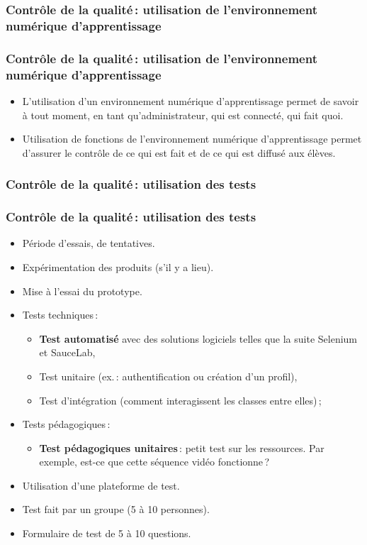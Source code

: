 					\subsubsection{Contrôle de la qualité\,: utilisation de l'environnement numérique d'apprentissage} 
							\begin{frame}
							\frametitle{Contrôle de la qualité\,: utilisation de l'environnement numérique d'apprentissage}
                        			
							\begin{itemize}
							\item L’utilisation d'un environnement numérique d'apprentissage permet de savoir à tout moment, en tant qu’administrateur, qui est connecté, qui fait quoi.
							\item Utilisation de fonctions de l'environnement numérique d'apprentissage permet d’assurer le contrôle de ce qui est fait et de ce qui est diffusé aux élèves.
							\end{itemize}						
					\end{frame}	
					\subsubsection{Contrôle de la qualité\,: utilisation des tests} 
							\begin{frame}[allowframebreaks]
							\frametitle{Contrôle de la qualité\,: utilisation des tests}
                        			
							\begin{itemize}
							\item Période d’essais, de tentatives.
							\item Expérimentation des produits (s’il y a lieu).
							\item Mise à l’essai du  prototype.
							\item Tests techniques\,:
								\begin{itemize}
								\item \textbf{Test automatisé } avec des solutions logiciels telles que la suite Selenium et SauceLab,
								\item Test unitaire (ex.\,: authentification ou création d’un profil),
								\item Test d’intégration (comment interagissent les classes entre elles)\,;
								\end{itemize}
							\item Tests pédagogiques\,:
								\begin{itemize}
								\item \textbf{Test pédagogiques unitaires}\,:  petit test sur les ressources. Par exemple, est-ce que cette séquence vidéo fonctionne\,?
								\end{itemize}
							\item Utilisation d’une plateforme de test.
							\item Test fait par un groupe (5 à 10 personnes).
							\item Formulaire de test de 5 à 10 questions.
							\end{itemize}						
					\end{frame}
						
